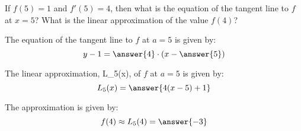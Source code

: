 \documentclass{ximera}
\author{Steven Gubkin}
\begin{document}
\begin{exercise}
If $f(5)=1$ and $f'(5) = 4$, then what is the equation of the tangent
line to $f$ at $x=5$?  What is the linear approximation of the value $f(4)$?

\begin{prompt}
The equation of the tangent line to $f$ at $a=5$ is given by:
 \[ y-1 = \answer{4}\cdot(x-\answer{5})\]
 
The linear approximation, L_5(x), of $f$ at $a=5$ is given by:
 \[L_5(x) = \answer{4(x-5)+1}\]
  
 The approximation is given by:
\[ f(4) \approx L_5(4)= \answer{-3}\]
\end{prompt}



\end{exercise}
\end{document}
